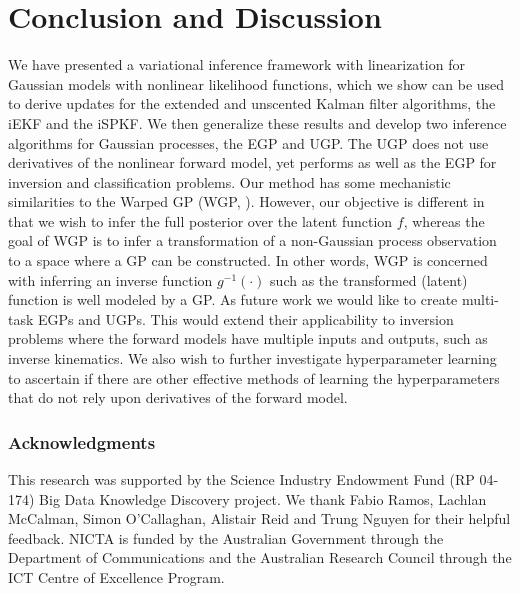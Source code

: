 \documentclass{article} %
\begin{document}
\section{Conclusion and Discussion}

We have presented a variational inference framework with linearization for
Gaussian models with nonlinear likelihood functions, which we show can be used
to derive updates for the extended and unscented Kalman filter algorithms, the
iEKF and the iSPKF. We then generalize these results and develop two inference
algorithms for Gaussian processes, the EGP and UGP. The UGP does not use
derivatives of the nonlinear forward model, yet performs as well as the EGP for
inversion and classification problems. 
%
Our method has some mechanistic similarities to the 
Warped GP (WGP, \cite{snelson2003warped}). However, our objective is different 
in that we wish to infer the full posterior over the latent function $f$, whereas 
the goal of  WGP is to infer a transformation of a non-Gaussian 
process observation to a space where a GP can be constructed. In other 
words, WGP is concerned with inferring an inverse function $g^{-1}(\cdot)$
such as the transformed (latent) function is well modeled by a GP.
%
As future work we would like to create
multi-task EGPs and UGPs. This would extend their applicability to inversion
problems where the forward models have multiple inputs and outputs, such as
inverse kinematics. We also wish to further investigate hyperparameter learning
to ascertain if there are other effective methods of learning the
hyperparameters that do not rely upon derivatives of the forward model. 


\subsubsection*{Acknowledgments}
{
\small
This research was supported by the Science Industry Endowment Fund (RP 04-174)
Big Data Knowledge Discovery project. We thank Fabio
Ramos, Lachlan McCalman, Simon O'Callaghan, Alistair Reid and Trung Nguyen for 
their helpful feedback.
%
NICTA is funded by the Australian Government through the Department of 
Communications and the Australian Research Council through the ICT Centre of Excellence Program.

}


% 



\end{document}
